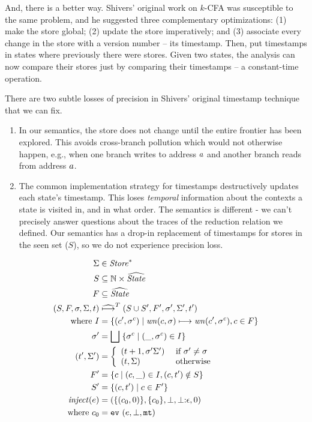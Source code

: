 \documentclass[preprint,onecolumn,9pt]{sigplanconf} %
\begin{document}
And, there is a better way. Shivers' original work on $k$-CFA was
susceptible to the same problem, and he suggested three complementary
optimizations: (1) make the store global; (2) update the store
imperatively; and (3) associate every change in the store with a
version number -- its timestamp. Then, put timestamps in states
where previously there were stores. Given two states, the analysis can
now compare their stores just by comparing their timestamps -- a
constant-time operation.

There are two subtle losses of precision in Shivers' original
timestamp technique that we can fix.

\begin{enumerate}
\item{In our semantics, the store does not change until the entire
    frontier has been explored. This avoids cross-branch pollution
    which would not otherwise happen, e.g., when one branch writes to
    address $a$ and another branch reads from address
    $a$.}
\item{The common implementation strategy for timestamps destructively
    updates each state's timestamp. This loses \emph{temporal}
    information about the contexts a state is visited in, and in what
    order. The semantics is different - we can't precisely answer
    questions about the traces of the reduction relation we defined.
    Our semantics has a drop-in replacement of timestamps for stores
    in the seen set ($S$), so we do not experience precision loss.}
\end{enumerate}

\begin{align*}
\Sigma &\in \mathit{Store}^* \\
S &\subseteq {\mathbb N} \times \widehat{\mathit{State}} \\
F &\subseteq \widehat{\mathit{State}} \\
(S, F, \sigma, \Sigma, t) &\mathrel{\widehat{\mathbin{\longmapsto}}^T} (S \cup S', F', \sigma', \Sigma', t') \\
\mbox{where } I &= \{(c',\sigma^c) \mid \mathit{wn}(c, \sigma) \mathrel{\mathbin{\longmapsto}} \mathit{wn}(c', \sigma^c), c \in F\} \\
              \sigma' &= \bigsqcup\; \{\sigma^c \mid (\_,\sigma^c) \in I\} \\
              (t',\Sigma') &=\left\{\begin{array}{ll}
                           (t+1,\sigma'\Sigma') & \text{ if } \sigma' \neq \sigma \\
                           (t,\Sigma)   & \text{ otherwise}
                          \end{array}\right. \\
              F' &= \{c \mid (c,\_) \in I, (c,t') \notin S\} \\
              S' &= \{(c,t') \mid c \in F'\}\\
\mathit{inject}(e) &= (\{(c_0, 0)\},\{c_0\},\bot,\bot {\tt :} \epsilon,0) \\
\text{ where } c_0 &= {\tt ev{\ }}({e,\bot,{\tt mt}})
\end{align*}
\end{document}
